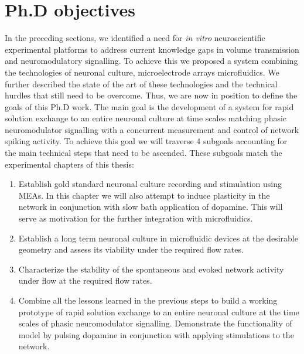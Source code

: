     \section{Ph.D objectives}
    In the preceding sections, we identified a need for \textit{in vitro} neuroscientific experimental platforms to address current knowledge gaps in volume transmission and neuromodulatory signalling. To achieve this we proposed a system combining the technologies of neuronal culture, microelectrode arrays microfluidics. We further described the state of the art of these technologies and the technical hurdles that still need to be overcome. Thus, we are now in position to define the goals of this Ph.D work. The main goal is the development of a system for rapid solution exchange to an entire neuronal culture at time scales matching phasic neuromodulator signalling with a concurrent measurement and control of network spiking activity. To achieve this goal we will traverse 4 subgoals accounting for the main technical steps that need to be ascended. These subgoals match the experimental chapters of this thesis:

    \begin{enumerate}
    \item Establish gold standard neuronal culture recording and stimulation using MEAs. In this chapter we will also attempt to induce plasticity in the network in conjunction with slow bath application of dopamine. This will serve as motivation for the further integration with microfluidics.

    \item Establish a long term neuronal culture in microfluidic devices at the desirable geometry and assess its viability under the required flow rates.

    \item Characterize the stability of the spontaneous and evoked network activity under flow at the required flow rates.

    \item Combine all the lessons learned in the previous steps to build a working prototype of rapid solution exchange to an entire neuronal culture at the time scales of phasic neuromodulator signalling. Demonstrate the functionality of model by pulsing dopamine in conjunction with applying stimulations to the network.
    \end{enumerate}


    \label{sec:introduction:objs}

